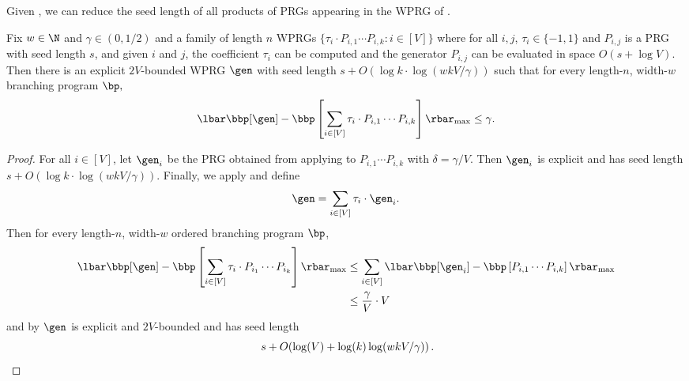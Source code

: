 \documentclass{toc}
\begin{document}
Given , we can reduce the seed length of all products of PRGs appearing in the WPRG of .
\begin{corollary}\label{cor:pathInner}
Fix $w \in \N$ and $\gamma \in (0,1/2)$ and a family of length $n$ WPRGs $\{\tau_i\cdot P_{i,1}\cdots P_{i,k}:i\in[V]\}$ where for all $i,j$, $\tau_i\in \{-1,1\}$ and $P_{i,j}$ is a PRG with seed length $s$, and given $i$ and $j$, the coefficient $\tau_i$ can be computed and the generator $P_{i,j}$ can be evaluated in space $O(s+\log V)$. Then there is an explicit $2V$-bounded WPRG $\gen$ with seed length $s+O(\log k\cdot \log(wkV/\gamma))$ such that for every length-$n$, width-$w$ branching program $\bp,$
$$\lbar\bbp[\gen] - \bbp\left[\sum_{i\in [V]}\tau_i\cdot P_{i,1}\cdots P_{i,k}\right]\rbar_{\max}\leq \gamma.$$
\end{corollary}
\begin{proof}
For all $i\in [V]$, let $\gen_i$ be the PRG obtained from applying  to $P_{i,1}\cdots P_{i,k}$ with $\delta=\gamma/V$. Then $\gen_i$ is explicit and has seed length $s+O(\log k\cdot\log(wkV/\gamma))$.
Finally, we apply  and define
$$\gen=\sum_{i\in [V]} \tau_i\cdot \gen_i.$$ 
Then for every length-$n$, width-$w$ ordered branching program $\bp$,
\begin{align*}
    \lbar\bbp[\gen] - \bbp\left[\sum_{i\in [V]}\tau_i\cdot P_{i_1}\cdots P_{i_k}\right]\rbar_{\max} &\leq  \sum_{i\in [V]}\lbar \bbp[\gen_i] - \bbp\left[P_{i,1}\cdots P_{i,k}\right] \rbar_{\max}\\
    &\leq \frac{\gamma}{V}\cdot V
\end{align*}
and by  $\gen$ is explicit and $2V$-bounded and has seed length
%
\[\ s+O(\log(V)+\log(k)\log(wkV/\gamma))\,.   \qedhere  \]
%
\end{proof}
\end{document}
